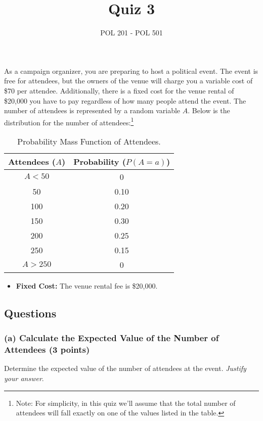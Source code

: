 \documentclass{article}
\title{Quiz 3}
\author{POL 201 - POL 501}
\date{}
\begin{document}
\maketitle


As a campaign organizer, you are preparing to host a political event. The event is free for attendees, but the owners of the venue will charge you a variable cost of \$70 per attendee. Additionally, there is a fixed cost for the venue rental of \$20,000 you have to pay regardless of how many people attend the event. The number of attendees is represented by a random variable $A$. Below is the distribution for the number of attendees:\footnote{Note: For simplicity, in this quiz we'll assume that the total number of attendees will fall exactly on one of the values listed in the table. }

\begin{table}[h!]
\centering
\begin{tabular}{c|c}
    \hline 
    Attendees ($A$) & Probability ($P(A = a)$) \\
    \hline
    $A < 50$ & 0 \\
    50 & 0.10 \\
    100 & 0.20 \\
    150 & 0.30 \\
    200 & 0.25 \\
    250 & 0.15 \\
    $A > 250$ & 0 \\
    \hline 
\end{tabular}
\caption{Probability Mass Function of Attendees.}
\end{table}
\begin{itemize}
    \item \textbf{Fixed Cost:} The venue rental fee is \$20,000.
\end{itemize}


\subsection*{Questions}

\subsubsection*{(a) Calculate the Expected Value of the Number of Attendees (3 points)}
Determine the expected value of the number of attendees at the event. \emph{Justify your answer}.

\begin{center}
\end{center}
\end{document}
